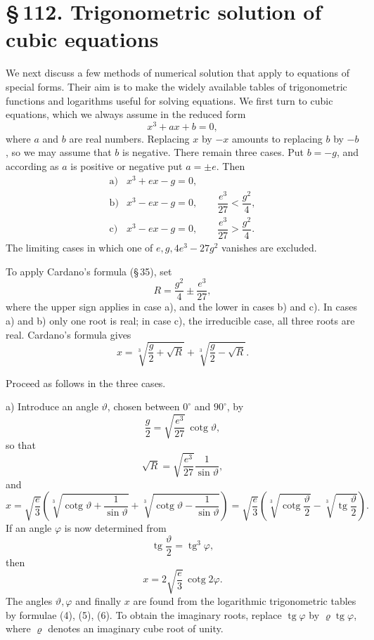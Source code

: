 \documentclass[11pt]{article}
\providecommand{\cotg}{\operatorname{cotg}}
\providecommand{\tg}{\operatorname{tg}}
\providecommand{\sect}[2]{\section*{\S\,#1. #2}}
\begin{document}
\sect{112}{Trigonometric solution of cubic equations}

We next discuss a few methods of numerical solution that apply to equations of special forms. Their aim is to make the widely available tables of trigonometric functions and logarithms useful for solving equations. We first turn to cubic equations, which we always assume in the reduced form
\begin{equation}
        x^3+ax+b=0,
\tag{1}
\end{equation}
where $a$ and $b$ are real numbers. Replacing $x$ by $-x$ amounts to replacing $b$ by $-b$, so we may assume that $b$ is negative. There remain three cases. Put $b=-g$, and according as $a$ is positive or negative put $a=\pm e$. Then
\[
\begin{array}{ll}
\mathrm{a)}&x^3+ex-g=0,\\[0.2em]
\mathrm{b)}&x^3-ex-g=0,\qquad \dfrac{e^3}{27}<\dfrac{g^2}{4},\\[0.5em]
\mathrm{c)}&x^3-ex-g=0,\qquad \dfrac{e^3}{27}>\dfrac{g^2}{4}.
\end{array}
\]
The limiting cases in which one of $e,g,4e^3-27g^2$ vanishes are excluded.

To apply Cardano's formula (\S\,35), set
\begin{equation}
        R=\frac{g^2}{4}\pm\frac{e^3}{27},
\tag{2}
\end{equation}
where the upper sign applies in case a), and the lower in cases b) and c). In cases a) and b) only one root is real; in case c), the irreducible case, all three roots are real. Cardano's formula gives
\begin{equation}
        x=\sqrt[3]{\frac g2+\sqrt R}
          +\sqrt[3]{\frac g2-\sqrt R}.
\tag{3}
\end{equation}

Proceed as follows in the three cases.

a) Introduce an angle $\vartheta$, chosen between $0^\circ$ and $90^\circ$, by
\begin{equation}
        \frac g2=\sqrt{\frac{e^3}{27}}\,\cotg\vartheta,
\tag{4}
\end{equation}
so that
\[
        \sqrt R=\sqrt{\frac{e^3}{27}}\frac1{\sin\vartheta},
\]
and
\[
x=\sqrt{\frac e3}\left(\sqrt[3]{\cotg\vartheta+\frac1{\sin\vartheta}}
+\sqrt[3]{\cotg\vartheta-\frac1{\sin\vartheta}}\right)
=\sqrt{\frac e3}\left(\sqrt[3]{\cotg\frac\vartheta2}
-\sqrt[3]{\tg\frac\vartheta2}\right).
\]
If an angle $\varphi$ is now determined from
\begin{equation}
        \tg\frac{\vartheta}{2}=\tg^3\varphi,
\tag{5}
\end{equation}
then
\begin{equation}
        x=2\sqrt{\frac e3}\,\cotg 2\varphi.
\tag{6}
\end{equation}
The angles $\vartheta,\varphi$ and finally $x$ are found from the logarithmic trigonometric tables by formulae (4), (5), (6). To obtain the imaginary roots, replace $\tg\varphi$ by $\varrho\tg\varphi$, where $\varrho$ denotes an imaginary cube root of unity.
\end{document}
